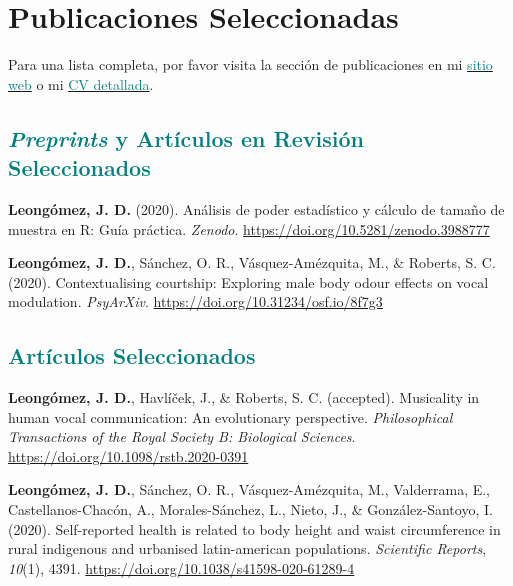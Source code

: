 \documentclass[11pt, a4paper]{awesome-cv}
\begin{document}
\hypertarget{publicaciones-seleccionadas}{%
\section{Publicaciones
Seleccionadas}\label{publicaciones-seleccionadas}}

Para una lista completa, por favor visita la sección de publicaciones en
mi
\href{https://jdleongomez.info/es/publication/}{\textcolor{teal}{sitio web}}
o mi
\href{https://jdleongomez.info/es/files/jdl_cv_es.pdf}{\textcolor{teal}{CV detallada}}.

\hypertarget{section}{%
\subsection{\texorpdfstring{\textcolor{teal}{\textit{Preprints} y Artículos en Revisión Seleccionados}}{}}\label{section}}

\begingroup
\setlength{\parindent}{-0.5in}
\setlength{\leftskip}{0.5in}

\hypertarget{refs_featured_preprint}{}
\leavevmode\hypertarget{ref-Leongomez2020a}{}%
\textbf{Leongómez, J. D.} (2020). {Análisis de poder estadístico y
cálculo de tamaño de muestra en R: Guía práctica}. \emph{Zenodo}.
\url{https://doi.org/10.5281/zenodo.3988777}

\leavevmode\hypertarget{ref-Leongomez2020}{}%
\textbf{Leongómez, J. D.}, Sánchez, O. R., Vásquez-Amézquita, M., \&
Roberts, S. C. (2020). Contextualising courtship: Exploring male body
odour effects on vocal modulation. \emph{PsyArXiv}.
\url{https://doi.org/10.31234/osf.io/8f7g3}

\endgroup

\hypertarget{section-1}{%
\subsection{\texorpdfstring{\textcolor{teal}{Artículos Seleccionados}}{}}\label{section-1}}

\begingroup
\setlength{\parindent}{-0.5in}
\setlength{\leftskip}{0.5in}

\hypertarget{refs_featured}{}
\leavevmode\hypertarget{ref-leongomezMusicalityHumanVocal2021}{}%
\textbf{Leongómez, J. D.}, Havlíček, J., \& Roberts, S. C. (accepted).
Musicality in human vocal communication: {An} evolutionary perspective.
\emph{Philosophical Transactions of the Royal Society B: Biological
Sciences}. \url{https://doi.org/10.1098/rstb.2020-0391}

\leavevmode\hypertarget{ref-Leonguxf3mez2020}{}%
\textbf{Leongómez, J. D.}, Sánchez, O. R., Vásquez-Amézquita, M.,
Valderrama, E., Castellanos-Chacón, A., Morales-Sánchez, L., Nieto, J.,
\& González-Santoyo, I. (2020). Self-reported health is related to body
height and waist circumference in rural indigenous and urbanised
latin-american populations. \emph{Scientific Reports}, \emph{10}(1),
4391. \url{https://doi.org/10.1038/s41598-020-61289-4}
\end{document}
